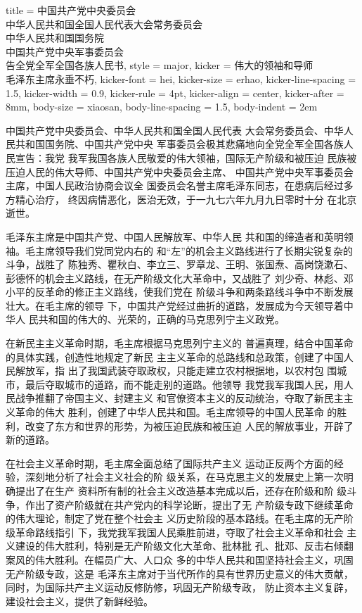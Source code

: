 \begin{hongqiarticle}{
    title  = {中国共产党中央委员会\\
        中华人民共和国全国人民代表大会常务委员会\\
        中华人民共和国国务院\\
        中国共产党中央军事委员会\\
        告全党全军全国各族人民书},
    style  = major,
    kicker = {伟大的领袖和导师\\毛泽东主席永垂不朽},
    kicker-font = hei,
    kicker-size = erhao,
    kicker-line-spacing = 1.5,
    kicker-width = 0.9\textwidth,
    kicker-rule = 4pt,
    kicker-align = center,
    kicker-after = 8mm,
    body-size = xiaosan,
    body-line-spacing = 1.5,
    body-indent = 2em
  }

  中国共产党中央委员会、中华人民共和国全国人民代表
  大会常务委员会、中华人民共和国国务院、中国共产党中央
  军事委员会极其悲痛地向全党全军全国各族人民宣告：我党
  我军我国各族人民敬爱的伟大领袖，国际无产阶级和被压迫
  民族被压迫人民的伟大导师、中国共产党中央委员会主席、
  中国共产党中央军事委员会主席，中国人民政治协商会议全
  国委员会名誉主席毛泽东同志，在患病后经过多方精心治疗，
  终因病情恶化，医治无效，于一九七六年九月九日零时十分
  在北京逝世。

  毛泽东主席是中国共产党、中国人民解放军、中华人民
  共和国的缔造者和英明领袖。毛主席领导我们党同党内右的
  和“左”的机会主义路线进行了长期尖锐复杂的斗争，战胜了
  陈独秀、瞿秋白、李立三、罗章龙、王明、张国焘、高岗饶漱石、
  彭德怀的机会主义路线，在无产阶级文化大革命中，又战胜了
  刘少奇、林彪、邓小平的反革命的修正主义路线，使我们党在
  阶级斗争和两条路线斗争中不断发展壮大。在毛主席的领导
  下，中国共产党经过曲折的道路，发展成为今天领导着中华人
  民共和国的伟大的、光荣的，正确的马克思列宁主义政党。

  在新民主主义革命时期，毛主席根据马克思列宁主义的
  普遍真理，结合中国革命的具体实践，创造性地规定了新民
  主主义革命的总路线和总政策，创建了中国人民解放军，指
  出了我国武装夺取政权，只能走建立农村根据地，以农村包
  围城市，最后夺取城市的道路，而不能走别的道路。他领导
  我党我军我国人民，用人民战争推翻了帝国主义、封建主义
  和官僚资本主义的反动统治，夺取了新民主主义革命的伟大
  胜利，创建了中华人民共和国。毛主席领导的中国人民革命
  的胜利，改变了东方和世界的形势，为被压迫民族和被压迫
  人民的解放事业，开辟了新的道路。

  在社会主义革命时期，毛主席全面总结了国际共产主义
  运动正反两个方面的经验，深刻地分析了社会主义社会的阶
  级关系，在马克思主义的发展史上第一次明确提出了在生产
  资料所有制的社会主义改造基本完成以后，还存在阶级和阶
  级斗争，作出了资产阶级就在共产党内的科学论断，提出了无
  产阶级专政下继续革命的伟大理论，制定了党在整个社会主
  义历史阶段的基本路线。在毛主席的无产阶级革命路线指引
  下，我党我军我国人民乘胜前进，夺取了社会主义革命和社会
  主义建设的伟大胜利，特别是无产阶级文化大革命、批林批
  孔、批邓、反击右倾翻案风的伟大胜利。在幅员广大、人口众
  多的中华人民共和国坚持社会主义，巩固无产阶级专政，这是
  毛泽东主席对于当代所作的具有世界历史意义的伟大贡献，
  同时，为国际共产主义运动反修防修，巩固无产阶级专政，
  防止资本主义复辟，建设社会主义，提供了新鲜经验。


\end{hongqiarticle}
